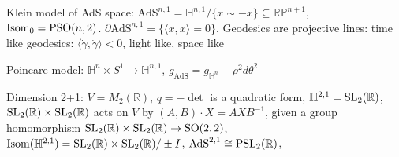 \documentclass[main]{subfiles}
\newcommand{\AdS}{\text{AdS}}
\begin{document}
Klein model of AdS space: $\AdS^{n,1}=\mathbb H^{n,1}/\{x\sim-x\}\subseteq\mathbb{RP}^{n+1}$, $\operatorname{Isom}_0=\operatorname{PSO}(n,2)$. $\partial \AdS^{n,1}=\{\langle x,x\rangle=0\}$. Geodesics are projective lines: time like geodesics: $\langle\dot\gamma,\dot\gamma\rangle<0$, light like, space like

Poincare model: $\mathbb H^n\times S^1\to\mathbb H^{n,1}$, $g_{\AdS}=g_{\mathbb H^n}-\rho^2d\theta^2$

Dimension 2+1: $V=M_2(\mathbb R)$, $q=-\det$ is a quadratic form, $\mathbb H^{2,1}=\operatorname{SL}_2(\mathbb R)$, $\operatorname{SL}_2(\mathbb R)\times\operatorname{SL}_2(\mathbb R)$ acts on $V$ by $(A,B)\cdot X=AXB^{-1}$, given a group homomorphism $\operatorname{SL}_2(\mathbb R)\times\operatorname{SL}_2(\mathbb R)\to\operatorname{SO}(2,2)$, $\operatorname{Isom}(\mathbb H^{2,1})=\operatorname{SL}_2(\mathbb R)\times\operatorname{SL}_2(\mathbb R)/\pm I$, $\AdS^{2,1}\cong\PSL_2(\mathbb R)$,
\end{document}
